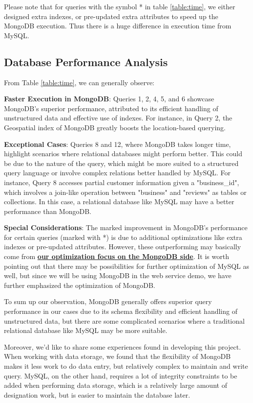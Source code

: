 \documentclass[runningheads]{llncs}
\begin{document}
Please note that for queries with the symbol * in table \ref{table:time}, we either designed extra indexes, or pre-updated extra attributes to speed up the MongoDB execution. Thus there is a huge difference in execution time from MySQL.

\subsection{Database Performance Analysis}

From Table \ref{table:time}, we can generally observe:

\textbf{Faster Execution in MongoDB}: Queries 1, 2, 4, 5, and 6 showcase MongoDB's superior performance, attributed to its efficient handling of unstructured data and effective use of indexes. For instance, in Query 2, the Geospatial index of MongoDB greatly boosts the location-based querying.

\textbf{Exceptional Cases}: Queries 8 and 12, where MongoDB takes longer time, highlight scenarios where relational databases might perform better. This could be due to the nature of the query, which might be more suited to a structured query language or involve complex relations better handled by MySQL. For instance, Query 8 accesses partial customer information given a "business\_id", which involves a join-like operation between "business" and "reviews" as tables or collections. In this case, a relational database like MySQL may have a better performance than MongoDB.

\textbf{Special Considerations}: The marked improvement in MongoDB's performance for certain queries (marked with *) is due to additional optimizations like extra indexes or pre-updated attributes. However, these outperforming may basically come from \underline{\textbf{our optimization focus on the MongoDB side}}. It is worth pointing out that there may be possibilities for further optimization of MySQL as well, but since we will be using MongoDB in the web service demo, we have further emphasized the optimization of MongoDB.


To sum up our observation, MongoDB generally offers superior query performance in our cases due to its schema flexibility and efficient handling of unstructured data, but there are some complicated scenarios where a traditional relational database like MySQL may be more suitable. 

Moreover, we'd like to share some experiences found in developing this project. When working with data storage, we found that the flexibility of MongoDB makes it less work to do data entry, but relatively complex to maintain and write query. MySQL, on the other hand, requires a lot of integrity constraints to be added when performing data storage, which is a relatively large amount of designation work, but is easier to maintain the database later.
\end{document}
